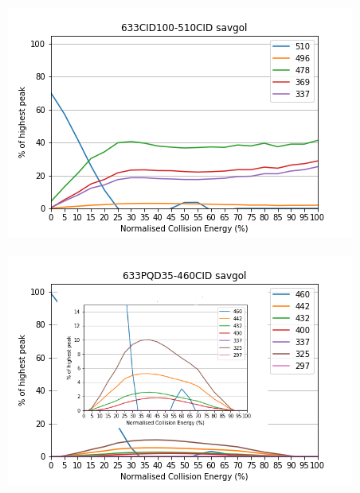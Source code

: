 \begin{figure}[!htbp]
  \begin{subfigure}[b]{0.5\textwidth}
    \includegraphics[width=\textwidth]{content/Anhang/ESIMS/RP_Bo-DNCC/633CID100-510CID-510savgol.png}
    \caption{}
  \end{subfigure}
  \hfill
  \begin{subfigure}[b]{0.5\textwidth}
    \includegraphics[width=\textwidth]{content/Anhang/ESIMS/RP_Bo-DNCC/633PQD35-460CID-460savgol_pic.png}
    \caption{}
  \end{subfigure}
  

\end{figure}
